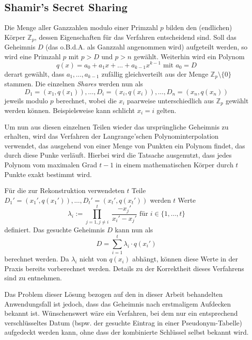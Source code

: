 \subsection{Shamir's Secret Sharing}

Die Menge aller Ganzzahlen modulo einer Primzahl \(p\) bilden den (endlichen) Körper \(\mathbb{Z}_p\), dessen Eigenschaften für das Verfahren entscheidend sind. Soll das Geheimnis \(D\) (das o.B.d.A. als Ganzzahl angenommen wird) aufgeteilt werden, so wird eine Primzahl \(p\) mit \(p > D\) und \(p > n\) gewählt. Weiterhin wird ein Polynom 
\[q(x) = a_0 + a_1x + \dots + a_{k-1}x^{k-1} \text{ mit } a_0 = D\] 
derart gewählt, dass \(a_1, \dots, a_{k-1}\) zufällig gleichverteilt aus der Menge \(\mathbb{Z}_p \setminus \{0\}\) stammen. Die einzelnen \textit{Shares} werden nun als
\[D_1=(x_1,q(x_1)), \dots, D_i=(x_i,q(x_i)), \dots, D_n=(x_n,q(x_n))\]
jeweils modulo \(p\) berechnet, wobei die \(x_i\) paarweise unterschiedlich aus \(\mathbb{Z}_p\) gewählt werden können. Beispielsweise kann schlicht \(x_i = i\) gelten.

Um nun aus diesen einzelnen Teilen wieder das ursprüngliche Geheimnis zu erhalten, wird das Verfahren der Langrange'schen Polynominterpolation verwendet, das ausgehend von einer Menge von Punkten ein Polynom findet, das durch diese Punke verläuft. Hierbei wird die Tatsache ausgenutzt, dass jedes Polynom vom maximalen Grad \(t-1\) in einem mathematischen Körper durch \(t\) Punkte exakt bestimmt wird.

Für die zur Rekonstruktion verwendeten \(t\) Teile \(D_1'=(x_1',q(x_1')),\dots,D_t'=(x_t',q(x_t'))\) werden \(t\) Werte 
\[\lambda_i := \prod_{j=1, j \not= i}^{t} \; \frac{- x_j'}{x_i' - x_j'} \text{ für } i \in \{1,\dots,t\}\] 
definiert. Das gesuchte Geheimnis \(D\) kann nun als
\[D = \sum_{i=1}^{t}\lambda_i \cdot q(x_i')\]
berechnet werden. Da \(\lambda_i\) nicht von \(q(x_i)\) abhängt, können diese Werte in der Praxis bereits vorberechnet werden. Details zu der Korrektheit dieses Verfahrens sind \cite{boneh2016} zu entnehmen.

Das Problem dieser Lösung bezogen auf den in dieser Arbeit behandelten Anwendungsfall ist jedoch, dass das Geheimnis nach erstmaligem Aufdecken bekannt ist. Wünschenswert wäre ein Verfahren, bei dem nur ein entsprechend verschlüsseltes Datum (bspw. der gesuchte Eintrag in einer Pseudonym-Tabelle) aufgedeckt werden kann, ohne dass der kombinierte Schlüssel selbst bekannt wird. 

